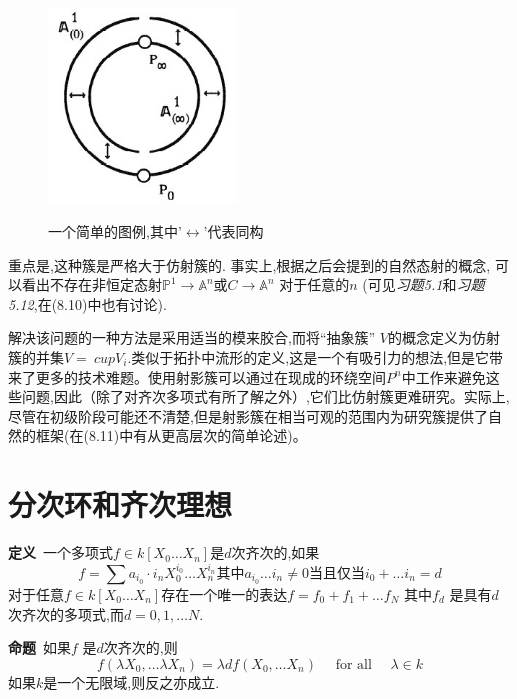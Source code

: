 \documentclass[UTF8]{book}
\begin{document}
		
		\begin{figure}[h]
			\centering
			\includegraphics[width=5cm]{50.jpg}\\
			\caption*{一个简单的图例,其中'$ \leftrightarrow $'代表同构}
		\end{figure}
	
		
		重点是,这种簇是严格大于仿射簇的. 事实上,根据之后会提到的自然态射的概念, 可以看出不存在非恒定态射$\mathbb{P} ^{1} \rightarrow \mathbb{A} ^{n}$或$C \rightarrow \mathbb{A}^{n}$ 对于任意的$n$ (可见\textit{习题5.1}和\textit{习题5.12},在(8.10)中也有讨论).
		
		
		解决该问题的一种方法是采用适当的模来胶合,而将“抽象簇” $ V $的概念定义为仿射簇的并集$ V = \ cup V _ {i} $.类似于拓扑中流形的定义,这是一个有吸引力的想法,但是它带来了更多的技术难题。使用射影簇可以通过在现成的环绕空间$ P ^ {n}$中工作来避免这些问题,因此（除了对齐次多项式有所了解之外）,它们比仿射簇更难研究。实际上,尽管在初级阶段可能还不清楚,但是射影簇在相当可观的范围内为研究簇提供了自然的框架(在(8.11)中有从更高层次的简单论述)。
		
	\section{分次环和齐次理想}
		\textbf{定义}\ 一个多项式$f \in k \left[ X _{0} \ldots X _{ n }\right]$是$ d $次齐次的,如果
		\begin{equation*}
			f =\sum a _{ i _{0}} \cdot i _{ n } X _{0}^{ i _{0}} \ldots X _{ n }^{ i _{ n }} \text{其中} a _{ i _{0}} \ldots i _{ n } \neq 0 \text{当且仅当} i _{0}+\ldots i _{ n }= d
		\end{equation*}
		对于任意$f \in k \left[ X _{0} \ldots X _{ n }\right]$存在一个唯一的表达$f = f _{0}+ f _{1}+\ldots f _{ N }$ 其中$f _{ d }$ 是具有$ d $次齐次的多项式,而$d =0,1, \ldots N$.
		
		
		\textbf{命题}\ 如果$f$ 是$ d $次齐次的,则
		\begin{equation*}
		f \left(\lambda X _{0}, \ldots \lambda X _{ n }\right)=\lambda d f \left( X _{0}, \ldots X _{ n }\right) \quad \text { for all } \quad \lambda \in k
		\end{equation*}
		如果$k$是一个无限域,则反之亦成立.
		
\end{document}
